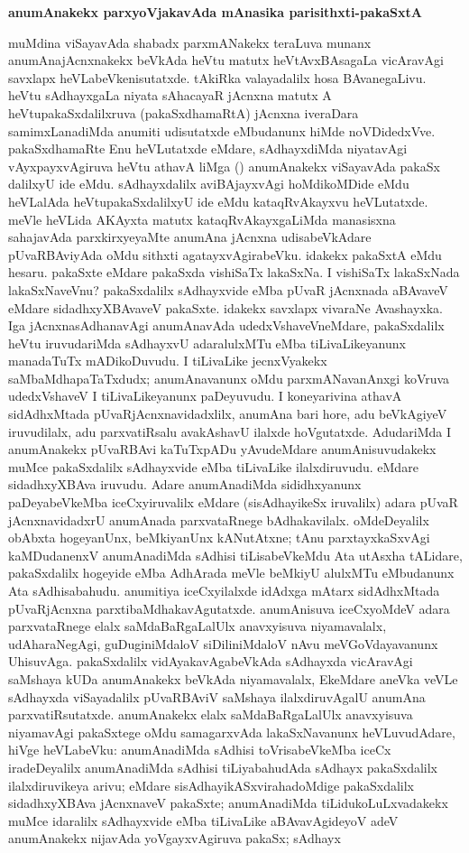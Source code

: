 \bigskip
\begin{center}
{\Large\bf anumAnakekx parxyoVjakavAda mAnasika parisithxti-pakaSxtA}
\end{center}

muMdina viSayavAda shabadx parxmANakekx teraLuva munanx anumAnajAcnxnakekx beVkAda heVtu matutx heVtAvxBAsagaLa vicAravAgi savxlapx heVLabeVkenisutatxde. tAkiRka valayadalilx hosa BAvanegaLivu. heVtu sAdhayxgaLa niyata sAhacayaR jAcnxna matutx A heVtupakaSxdalilxruva (pakaSxdhamaRtA) jAcnxna iveraDara samimxLanadiMda anumiti udisutatxde eMbudanunx hiMde noVDidedxVve. pakaSxdhamaRte Enu heVLutatxde eMdare, sAdhayxdiMda niyatavAgi vAyxpayxvAgiruva heVtu athavA liMga () anumAnakekx viSayavAda pakaSx dalilxyU ide eMdu. sAdhayxdalilx aviBAjayxvAgi hoMdikoMDide eMdu heVLalAda heVtupakaSxdalilxyU ide eMdu kataqRvAkayxvu  heVLutatxde. meVle heVLida AKAyxta matutx kataqRvAkayxgaLiMda manasisxna sahajavAda parxkirxyeyaMte anumAna jAcnxna udisabeVkAdare pUvaRBAviyAda oMdu sithxti agatayxvAgirabeVku. idakekx pakaSxtA eMdu hesaru. pakaSxte eMdare pakaSxda vishiSaTx lakaSxNa. I vishiSaTx lakaSxNada lakaSxNaveVnu? pakaSxdalilx sAdhayxvide eMba pUvaR jAcnxnada aBAvaveV eMdare sidadhxyXBAvaveV pakaSxte. idakekx savxlapx vivaraNe Avashayxka. Iga jAcnxnasAdhanavAgi anumAnavAda udedxVshaveVneMdare, pakaSxdalilx heVtu iruvudariMda sAdhayxvU adaralulxMTu eMba tiLivaLikeyanunx manadaTuTx mADikoDuvudu. I tiLivaLike jecnxVyakekx saMbaMdhapaTaTxdudx; anumAnavanunx oMdu parxmANavanAnxgi koVruva udedxVshaveV I tiLivaLikeyanunx paDeyuvudu. I koneyarivina athavA sidAdhxMtada pUvaRjAcnxnavidadxlilx, anumAna bari hore, adu beVkAgiyeV iruvudilalx, adu parxvatiRsalu avakAshavU ilalxde hoVgutatxde. AdudariMda I anumAnakekx pUvaRBAvi kaTuTxpADu yAvudeMdare anumAnisuvudakekx muMce pakaSxdalilx sAdhayxvide eMba tiLivaLike ilalxdiruvudu. eMdare sidadhxyXBAva iruvudu. Adare anumAnadiMda sididhxyanunx paDeyabeVkeMba iceCxyiruvalilx eMdare (sisAdhayikeSx iruvalilx) adara pUvaR jAcnxnavidadxrU anumAnada parxvataRnege bAdhakavilalx. oMdeDeyalilx obAbxta hogeyanUnx, beMkiyanUnx kANutAtxne; tAnu parxtayxkaSxvAgi kaMDudanenxV anumAnadiMda sAdhisi tiLisabeVkeMdu Ata utAsxha tALidare, pakaSxdalilx hogeyide eMba AdhArada meVle beMkiyU alulxMTu eMbudanunx Ata sAdhisabahudu. anumitiya iceCxyilalxde idAdxga mAtarx sidAdhxMtada pUvaRjAcnxna parxtibaMdhakavAgutatxde. anumAnisuva iceCxyoMdeV adara parxvataRnege elalx saMdaBaRgaLalUlx anavxyisuva niyamavalalx, udAharaNegAgi, guDuginiMdaloV siDiliniMdaloV nAvu meVGoVdayavanunx UhisuvAga. pakaSxdalilx vidAyakavAgabeVkAda sAdhayxda vicAravAgi saMshaya kUDa anumAnakekx beVkAda niyamavalalx, EkeMdare aneVka veVLe sAdhayxda viSayadalilx pUvaRBAviV saMshaya ilalxdiruvAgalU anumAna parxvatiRsutatxde. anumAnakekx elalx saMdaBaRgaLalUlx anavxyisuva niyamavAgi pakaSxtege oMdu samagarxvAda lakaSxNavanunx heVLuvudAdare, hiVge heVLabeVku: anumAnadiMda sAdhisi toVrisabeVkeMba iceCx iradeDeyalilx anumAnadiMda sAdhisi tiLiyabahudAda sAdhayx pakaSxdalilx ilalxdiruvikeya arivu; eMdare sisAdhayikASxvirahadoMdige pakaSxdalilx sidadhxyXBAva jAcnxnaveV pakaSxte; anumAnadiMda tiLidukoLuLxvadakekx muMce idaralilx sAdhayxvide eMba tiLivaLike aBAvavAgideyoV adeV anumAnakekx nijavAda yoVgayxvAgiruva pakaSx; sAdhayx 